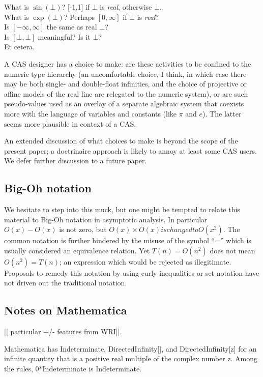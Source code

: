 \documentclass{article}
\begin{document}
\noindent
  What is $\sin(\bot)$?  [-1,1] if $\bot$ is {\em real}, otherwise $\bot$.\\
  What is $\exp(\bot)$?   Perhaps $[0,\infty]$ if $\bot$ is {\em real}?\\
  Is $[-\infty,\infty]$ the same as real $\bot$?\\
  Is $[\bot,\bot]$ meaningful?  Is it $\bot$?\\

Et cetera.
\medskip

A CAS designer has a choice to make: are these activities to be confined to the
numeric type hierarchy (an uncomfortable choice, I think, in which
case there may be both single- and double-float infinities, and the
choice of projective or affine models of the real line are relegated
to the numeric system), or are such pseudo-values used as an overlay
of a separate algebraic system that coexists more with the language of
variables and constants (like $\pi$ and $e$).  The latter seems more
plausible in context of a CAS.

An extended discussion of what choices to make is beyond the scope of the
present paper; a doctrinaire approach is likely to annoy at least some
CAS users. We defer further discussion to a future paper.
\subsection{Big-Oh notation}
We hesitate to step into this muck, but one might be tempted to relate
this material to Big-Oh notation in asymptotic analysis. In particular
$O(x)-O(x)$ is not zero, but $O(x) \times O(x) is changed to O(x^2)$.
The common notation is further hindered by the misuse of the symbol
``='' which is usually considered an equivalence relation.  Yet
$T(n)=O(n^2)$ does not mean $O(n^2)=T(n)$; an expression which would
be rejected as illegitimate.  Proposals to remedy this notation by
using curly inequalities or set notation have not driven out the
traditional notation.

\subsection {Notes on Mathematica}

[[ particular +/- features from WRI]].

Mathematica has Indeterminate, DirectedInfinity[], and
DirectedInfinity[z] for an infinite quantity that is a positive real
multiple of the complex number z. Among the rules, 0*Indeterminate is
Indeterminate.
\end{document}

